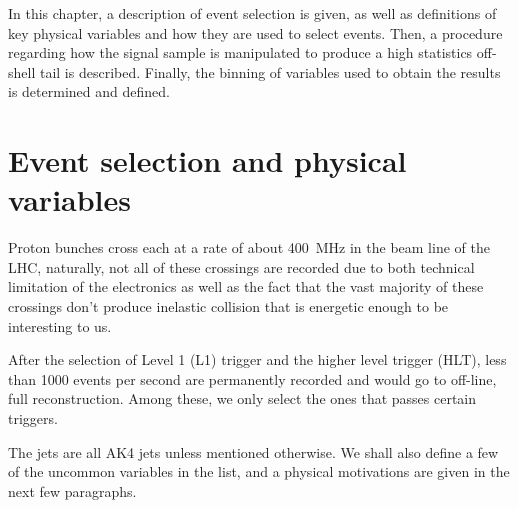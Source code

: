 In this chapter, a description of event selection is given, as well as definitions of
key physical variables and how they are used to select events. Then, a procedure regarding
how the signal sample is manipulated to produce a high statistics off-shell tail is described.
Finally, the binning of variables used to obtain the results is determined and defined.

\section{Event selection and physical variables}
Proton bunches cross each at a rate of about \SI{400}{\mega\hertz} in the beam line of
the LHC, naturally, not all of these crossings are recorded due to both technical
limitation of the electronics as well as the fact that the vast majority of these
crossings don't produce inelastic collision that is energetic enough to be interesting to us.

After the selection of Level 1 (L1) trigger and the higher level trigger (HLT), less than 1000
events per second are permanently recorded and would go to off-line, full reconstruction. Among these,
we only select the ones that passes certain triggers.

The jets are all AK4 jets unless mentioned otherwise. We shall also define a few of the
uncommon variables in the list, and a physical motivations are given in the next few
paragraphs.

